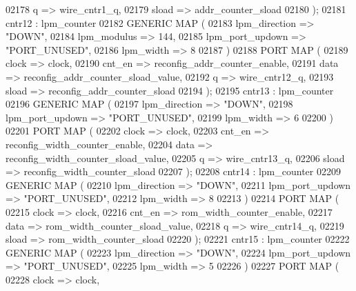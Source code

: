 \begin{DoxyCode}
{02178         q => wire_cntr1_q,
02179         sload => addr_counter_sload
02180       \textcolor{vhdlchar}{)};
02181     cntr12 :  lpm\_counter
02182       \textcolor{keywordflow}{GENERIC} \textcolor{keywordflow}{MAP} (
02183         lpm\_direction => \textcolor{keyword}{"DOWN"},
02184         lpm\_modulus => \textcolor{vhdllogic}{144},
02185         lpm\_port\_updown => \textcolor{keyword}{"PORT\_UNUSED"},
02186         lpm\_width => \textcolor{vhdllogic}{8}
02187       \textcolor{vhdlchar}{)}
02188       \textcolor{keywordflow}{PORT} \textcolor{keywordflow}{MAP} ( 
02189         clock => clock,
02190         cnt\_en => reconfig_addr_counter_enable,
02191         data => reconfig_addr_counter_sload_value,
02192         q => wire_cntr12_q,
02193         sload => reconfig_addr_counter_sload
02194       \textcolor{vhdlchar}{)};
02195     cntr13 :  lpm\_counter
02196       \textcolor{keywordflow}{GENERIC} \textcolor{keywordflow}{MAP} (
02197         lpm\_direction => \textcolor{keyword}{"DOWN"},
02198         lpm\_port\_updown => \textcolor{keyword}{"PORT\_UNUSED"},
02199         lpm\_width => \textcolor{vhdllogic}{6}
02200       \textcolor{vhdlchar}{)}
02201       \textcolor{keywordflow}{PORT} \textcolor{keywordflow}{MAP} ( 
02202         clock => clock,
02203         cnt\_en => reconfig_width_counter_enable,
02204         data => reconfig_width_counter_sload_value,
02205         q => wire_cntr13_q,
02206         sload => reconfig_width_counter_sload
02207       \textcolor{vhdlchar}{)};
02208     cntr14 :  lpm\_counter
02209       \textcolor{keywordflow}{GENERIC} \textcolor{keywordflow}{MAP} (
02210         lpm\_direction => \textcolor{keyword}{"DOWN"},
02211         lpm\_port\_updown => \textcolor{keyword}{"PORT\_UNUSED"},
02212         lpm\_width => \textcolor{vhdllogic}{8}
02213       \textcolor{vhdlchar}{)}
02214       \textcolor{keywordflow}{PORT} \textcolor{keywordflow}{MAP} ( 
02215         clock => clock,
02216         cnt\_en => rom_width_counter_enable,
02217         data => rom_width_counter_sload_value,
02218         q => wire_cntr14_q,
02219         sload => rom_width_counter_sload
02220       \textcolor{vhdlchar}{)};
02221     cntr15 :  lpm\_counter
02222       \textcolor{keywordflow}{GENERIC} \textcolor{keywordflow}{MAP} (
02223         lpm\_direction => \textcolor{keyword}{"DOWN"},
02224         lpm\_port\_updown => \textcolor{keyword}{"PORT\_UNUSED"},
02225         lpm\_width => \textcolor{vhdllogic}{5}
02226       \textcolor{vhdlchar}{)}
02227       \textcolor{keywordflow}{PORT} \textcolor{keywordflow}{MAP} ( 
02228         clock => clock,
}
\end{DoxyCode}
